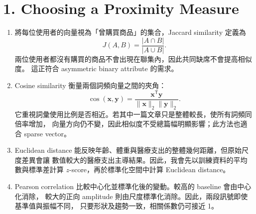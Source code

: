 \section*{1. Choosing a Proximity Measure}

\begin{enumerate}
  \item {}
  將每位使用者的向量視為「曾購買商品」的集合，Jaccard similarity 定義為
  \[
    J(A,B)=\frac{|A\cap B|}{|A\cup B|}.
  \]
  兩位使用者都沒有購買的商品不會出現在聯集內，因此共同缺席不會提高相似度。
  這正符合 asymmetric binary attribute 的需求。

  \item {}
  Cosine similarity 衡量兩個詞頻向量之間的夾角：
  \[
    \cos(\mathbf{x},\mathbf{y})=
    \frac{\mathbf{x}^{\mathsf T}\mathbf{y}}
         {\lVert\mathbf{x}\rVert_2\lVert\mathbf{y}\rVert_2}.
  \]
  它重視詞彙使用比例是否相近。若其中一篇文章只是整體較長，使所有詞頻同倍率增加，
  向量方向仍不變，因此相似度不受總篇幅明顯影響；此方法也適合 sparse vector。

  \item {}
  Euclidean distance 能反映年齡、體重與醫療支出的整體幾何距離，但原始尺度差異會讓
  數值較大的醫療支出主導結果。因此，我會先以訓練資料的平均數與標準差計算
  $z$-score，再於標準化空間中計算 Euclidean distance。

  \item {}
  Pearson correlation 比較中心化並標準化後的變動。較高的 baseline 會由中心化消除，
  較大的正向 amplitude 則由尺度標準化消除。因此，兩段訊號即使基準值與振幅不同，
  只要形狀及趨勢一致，相關係數仍可接近 1。
\end{enumerate}

\clearpage
